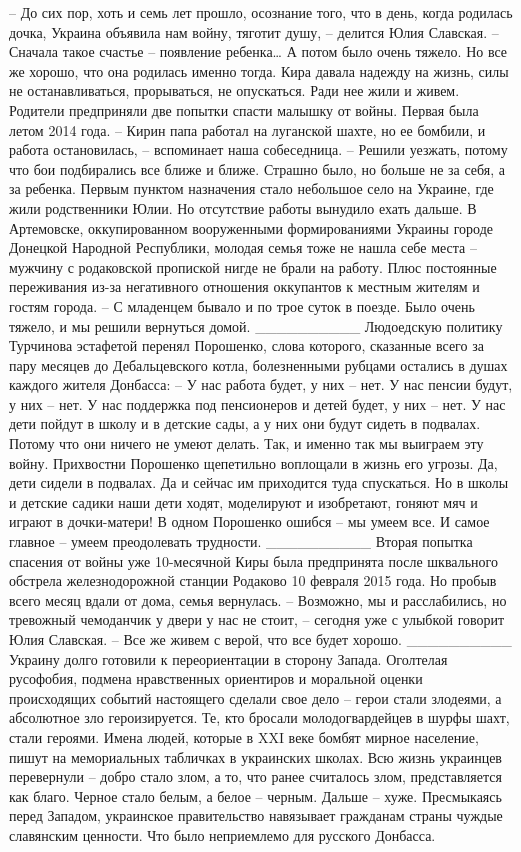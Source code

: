 – До сих пор, хоть и семь лет прошло, осознание того, что в день, когда родилась дочка, Украина объявила нам войну, тяготит душу, – делится Юлия Славская. – Сначала такое счастье – появление ребенка… А потом было очень тяжело. Но все же хорошо, что она родилась именно тогда. Кира давала надежду на жизнь, силы не останавливаться, прорываться, не опускаться. Ради нее жили и живем.
Родители предприняли две попытки спасти малышку от войны. Первая была летом 2014 года.
– Кирин папа работал на луганской шахте, но ее бомбили, и работа остановилась, – вспоминает наша собеседница. – Решили уезжать, потому что бои подбирались все ближе и ближе. Страшно было, но больше не за себя, а за ребенка.
Первым пунктом назначения стало небольшое село на Украине, где жили родственники Юлии. Но отсутствие работы вынудило ехать дальше. В Артемовске, оккупированном вооруженными формированиями Украины городе Донецкой Народной Республики, молодая семья тоже не нашла себе места – мужчину с родаковской пропиской нигде не брали на работу. Плюс постоянные переживания из-за негативного отношения оккупантов к местным жителям и гостям города.
– С младенцем бывало и по трое суток в поезде. Было очень тяжело, и мы решили вернуться домой.
__________
Людоедскую политику Турчинова эстафетой перенял Порошенко, слова которого, сказанные всего за пару месяцев до Дебальцевского котла, болезненными рубцами остались в душах каждого жителя Донбасса:
– У нас работа будет, у них – нет. У нас пенсии будут, у них – нет. У нас поддержка под пенсионеров и детей будет, у них – нет. У нас дети пойдут в школу и в детские сады, а у них они будут сидеть в подвалах. Потому что они ничего не умеют делать. Так, и именно так мы выиграем эту войну.
Прихвостни Порошенко щепетильно воплощали в жизнь его угрозы. Да, дети сидели в подвалах. Да и сейчас им приходится туда спускаться. Но в школы и детские садики наши дети ходят, моделируют и изобретают, гоняют мяч и играют в дочки-матери! В одном Порошенко ошибся – мы умеем все. И самое главное – умеем преодолевать трудности.
__________
Вторая попытка спасения от войны уже 10-месячной Киры была предпринята после шквального обстрела железнодорожной станции Родаково 10 февраля 2015 года. Но пробыв всего месяц вдали от дома, семья вернулась.
– Возможно, мы и расслабились, но тревожный чемоданчик у двери у нас не стоит, – сегодня уже с улыбкой говорит Юлия Славская. – Все же живем с верой, что все будет хорошо.
__________
Украину долго готовили к переориентации в сторону Запада. Оголтелая русофобия, подмена нравственных ориентиров и моральной оценки происходящих событий настоящего сделали свое дело – герои стали злодеями, а абсолютное зло героизируется. Те, кто бросали молодогвардейцев в шурфы шахт, стали героями. Имена людей, которые в XXI веке бомбят мирное население, пишут на мемориальных табличках в украинских школах. Всю жизнь украинцев перевернули – добро стало злом, а то, что ранее считалось злом, представляется как благо. Черное стало белым, а белое – черным. Дальше – хуже. Пресмыкаясь перед Западом, украинское правительство навязывает гражданам страны чуждые славянским ценности. Что было неприемлемо для русского Донбасса.
